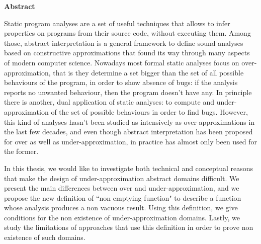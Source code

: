 \thispagestyle{plain}
\begin{center}
	\Large
	\textbf{\thesistitle}


	\vspace{1.2cm}
	\large
	\peopleheader
	\textbf{\authornamefl} \hfill \textbf{\supervisors}

	\vspace{2.0cm}
	\textbf{Abstract}
\end{center}
Static program analyses are a set of useful techniques that allows to infer properties on programs from their source code, without executing them. Among those, abstract interpretation is a general framework to define sound analyses based on constructive approximations that found its way through many aspects of modern computer science.
Nowadays most formal static analyses focus on over-approximation, that is they determine a set bigger than the set of all possible behaviours of the program, in order to show absence of bugs: if the analysis reports no unwanted behaviour, then the program doesn't have any.
In principle there is another, dual application of static analyses: to compute and under-approximation of the set of possible behaviours in order to find bugs. However, this kind of analyses hasn't been studied as intensively as over-approximations in the last few decades, and even though abstract interpretation has been proposed for over as well as under-approximation, in practice has almost only been used for the former.

In this thesis, we would like to investigate both technical and conceptual reasons that make the design of under-approximation abstract domains difficult. We present the main differences between over and under-approximation, and we propose the new definition of ``non emptying function" to describe a function whose analysis produces a non vacuous result. Using this definition, we give conditions for the non existence of under-approximation domains. Lastly, we study the limitations of approaches that use this definition in order to prove non existence of such domains.
